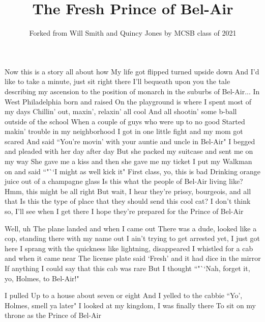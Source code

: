\documentclass{article}
\title{The Fresh Prince of Bel-Air}
\author{Forked from Will Smith and Quincy Jones by MCSB class of 2021}
\begin{document}
\maketitle

Now this is a story all about how
My life got flipped turned upside down
And I'd like to take a minute, just sit right there
I'll bequeath upon you the tale describing my ascension to the position of monarch in the suburbs of Bel-Air...
In West Philadelphia born and raised
On the playground is where I spent most of my days
Chillin' out, maxin', relaxin' all cool
And all shootin' some b-ball outside of the school
When a couple of guys who were up to no good
Started makin' trouble in my neighborhood
I got in one little fight and my mom got scared
And said ``You're movin' with your auntie and uncle in Bel-Air"
I begged and pleaded with her day after day
But she packed my suitcase and sent me on my way
She gave me a kiss and then she gave me my ticket
I put my Walkman on and said ``"``I might as well kick it"
First class, yo, this is bad
Drinking orange juice out of a champagne glass
Is this what the people of Bel-Air living like?
Hmm, this might be all right
But wait, I hear they're prissy, bourgeois, and all that
Is this the type of place that they should send this cool cat?
I don't think so, I'll see when I get there
I hope they're prepared for the Prince of Bel-Air

Well, uh
The plane landed and when I came out
There was a dude, looked like a cop, standing there with my name out
I ain't trying to get arrested yet, I just got here
I sprang with the quickness like lightning, disappeared
I whistled for a cab and when it came near
The license plate said `Fresh' and it had dice in the mirror
If anything I could say that this cab was rare
But I thought ``"``Nah, forget it, yo, Holmes, to Bel-Air!"

I pulled
Up to a house about seven or eight
And I yelled to the cabbie ``Yo', Holmes, smell ya later"
I looked at my kingdom, I was finally there
To sit on my throne as the Prince of Bel-Air
\end{document}
